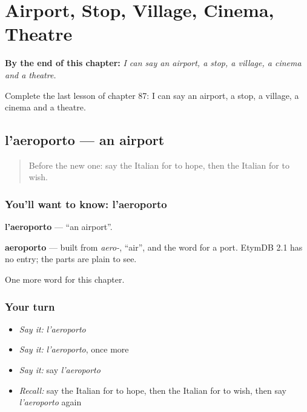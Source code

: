 
\chapter{Airport, Stop, Village, Cinema, Theatre}
\label{ch:it-airport-stop-village-cinema-theatre}

\begin{chapteropening}
\textbf{By the end of this chapter:} \emph{I can say an airport, a stop, a village, a cinema and a theatre.}

Complete the last lesson of chapter 87: I can say an airport, a stop, a village, a cinema and a theatre.
\end{chapteropening}

\section[l'aeroporto]{l'aeroporto — an airport}

\label{lesson:IT-C87-aeroporto}



\begin{quote}
Before the new one: say the Italian for to hope, then the Italian for to wish.
\end{quote}

\subsection*{You'll want to know: l'aeroporto}
\textbf{l'aeroporto} — \textquotedblleft{}an airport\textquotedblright{}.

\begin{cousinweb}
\textbf{aeroporto} — built from \emph{aero-}, \textquotedblleft{}air\textquotedblright{}, and the word for a port. EtymDB 2.1 has no entry; the parts are plain to see.
\end{cousinweb}

\begin{grammarlens}[title={What you've built}]
One more word for this chapter.
\end{grammarlens}

\subsection*{Your turn}
\begin{itemize}
\raggedright
  \item \emph{Say it:} \emph{l'aeroporto}
  \item \emph{Say it:} \emph{l'aeroporto}, once more
  \item \emph{Say it:} say \emph{l'aeroporto}
  \item \emph{Recall:} say the Italian for to hope, then the Italian for to wish, then say \emph{l'aeroporto} again
\end{itemize}

